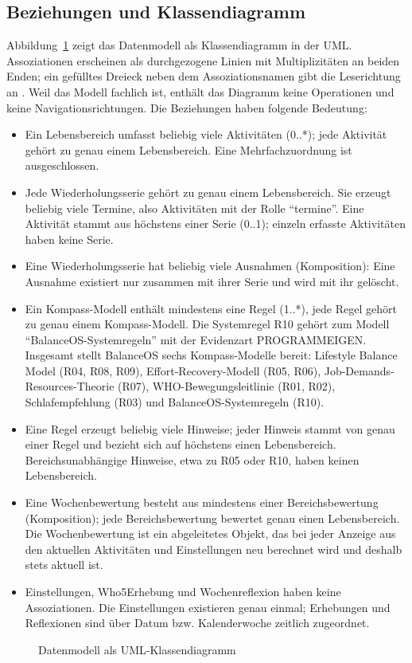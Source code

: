 \subsection{Beziehungen und Klassendiagramm}\label{sec:klassendiagramm}
Abbildung~\ref{abb:datenmodell} zeigt das Datenmodell als Klassendiagramm in der \ac{UML}. Assoziationen erscheinen als durchgezogene Linien mit Multiplizitäten an beiden Enden; ein gefülltes Dreieck neben dem Assoziationsnamen gibt die Leserichtung an \parencite[S.~201]{omg2017uml}. Weil das Modell fachlich ist, enthält das Diagramm keine Operationen und keine Navigationsrichtungen. Die Beziehungen haben folgende Bedeutung:
\begin{itemize}
  \item Ein Lebensbereich umfasst beliebig viele Aktivitäten (0..*); jede Aktivität gehört zu genau einem Lebensbereich. Eine Mehrfachzuordnung ist ausgeschlossen.
  \item Jede Wiederholungsserie gehört zu genau einem Lebensbereich. Sie erzeugt beliebig viele Termine, also Aktivitäten mit der Rolle \enquote{termine}. Eine Aktivität stammt aus höchstens einer Serie (0..1); einzeln erfasste Aktivitäten haben keine Serie.
  \item Eine Wiederholungsserie hat beliebig viele Ausnahmen (Komposition): Eine Ausnahme existiert nur zusammen mit ihrer Serie und wird mit ihr gelöscht.
  \item Ein Kompass-Modell enthält mindestens eine Regel (1..*), jede Regel gehört zu genau einem Kompass-Modell. Die Systemregel R10 gehört zum Modell \enquote{BalanceOS-Systemregeln} mit der Evidenzart PROGRAMMEIGEN. Insgesamt stellt BalanceOS sechs Kompass-Modelle bereit: Lifestyle Balance Model (R04, R08, R09), Effort-Recovery-Modell (R05, R06), Job-Demands-Resources-Theorie (R07), WHO-Bewegungsleitlinie (R01, R02), Schlafempfehlung (R03) und BalanceOS-Systemregeln (R10).
  \item Eine Regel erzeugt beliebig viele Hinweise; jeder Hinweis stammt von genau einer Regel und bezieht sich auf höchstens einen Lebensbereich. Bereichsunabhängige Hinweise, etwa zu R05 oder R10, haben keinen Lebensbereich.
  \item Eine Wochenbewertung besteht aus mindestens einer Bereichsbewertung (Komposition); jede Bereichsbewertung bewertet genau einen Lebensbereich. Die Wochenbewertung ist ein abgeleitetes Objekt, das bei jeder Anzeige aus den aktuellen Aktivitäten und Einstellungen neu berechnet wird und deshalb stets aktuell ist.
  \item Einstellungen, Who5Erhebung und Wochenreflexion haben keine Assoziationen. Die Einstellungen existieren genau einmal; Erhebungen und Reflexionen sind über Datum bzw. Kalenderwoche zeitlich zugeordnet.
\end{itemize}

\begin{figure}[H]
  \caption{Datenmodell als UML-Klassendiagramm}\label{abb:datenmodell}
  \centering
\end{figure}
